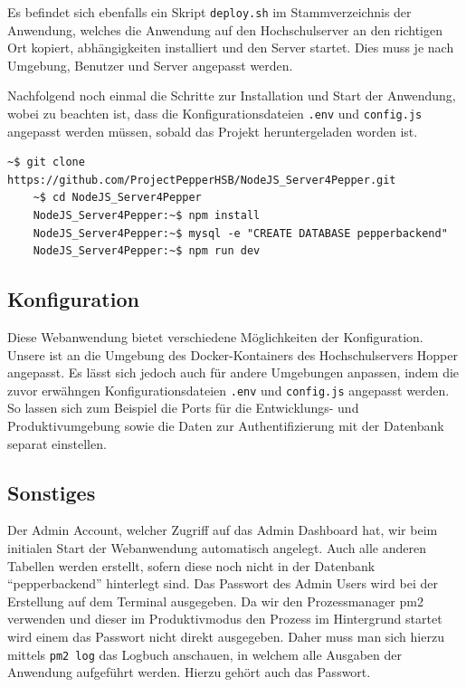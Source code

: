 Es befindet sich ebenfalls ein Skript \verb|deploy.sh| im Stammverzeichnis der Anwendung, welches die Anwendung auf den Hochschulserver
an den richtigen Ort kopiert, abhängigkeiten installiert und den Server startet. Dies muss je nach Umgebung, Benutzer und Server
angepasst werden.

Nachfolgend noch einmal die Schritte zur Installation und Start der Anwendung, wobei zu beachten ist,
dass die Konfigurationsdateien \verb|.env| und \verb|config.js| angepasst werden müssen, sobald das Projekt heruntergeladen
worden ist.\\

\begin{lstlisting}[basicstyle=\footnotesize,xleftmargin=-.1in]
    ~$ git clone https://github.com/ProjectPepperHSB/NodeJS_Server4Pepper.git 
    ~$ cd NodeJS_Server4Pepper
    NodeJS_Server4Pepper:~$ npm install
    NodeJS_Server4Pepper:~$ mysql -e "CREATE DATABASE pepperbackend"
    NodeJS_Server4Pepper:~$ npm run dev
\end{lstlisting}
\vspace{.3cm}

\subsection*{Konfiguration}
\label{sec:nodechapter-config}
Diese Webanwendung bietet verschiedene Möglichkeiten der Konfiguration. Unsere ist an die Umgebung des Docker-Kontainers
des Hochschulservers Hopper angepasst. Es lässt sich jedoch auch für andere Umgebungen anpassen, indem die zuvor erwähngen Konfigurationsdateien \verb|.env| und \verb|config.js| angepasst werden. So lassen sich zum Beispiel die Ports für die Entwicklungs- und Produktivumgebung sowie die Daten zur Authentifizierung mit der Datenbank separat einstellen.\\


\subsection*{Sonstiges}
\label{sec:nodechapter-install-other}
Der Admin Account, welcher Zugriff auf das Admin Dashboard hat, wir beim initialen Start der Webanwendung automatisch angelegt. Auch alle anderen Tabellen werden erstellt, sofern diese noch nicht in der Datenbank ``pepperbackend'' hinterlegt sind. Das Passwort des Admin Users wird bei der Erstellung auf dem Terminal ausgegeben. Da wir den Prozessmanager pm2 verwenden und dieser im Produktivmodus den Prozess im Hintergrund startet wird einem das Passwort nicht direkt ausgegeben. Daher muss man sich hierzu mittels \verb|pm2 log| das Logbuch anschauen, in welchem alle Ausgaben der Anwendung aufgeführt werden. Hierzu
gehört auch das Passwort.\\


